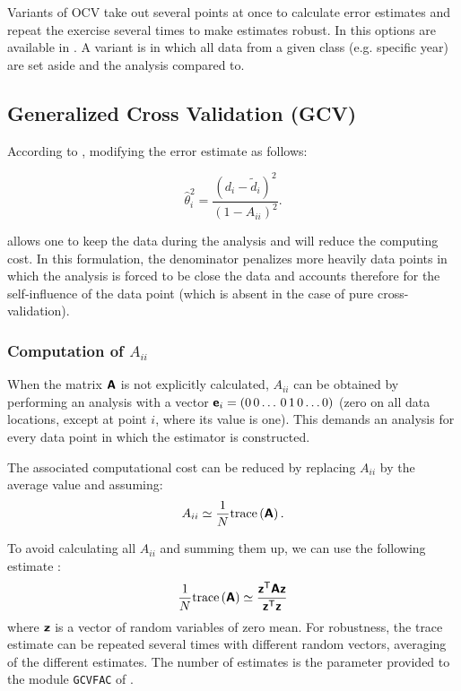 Variants of OCV take out several points at once to calculate error estimates and repeat the exercise several times to make estimates robust.  In \diva this options are available in . A variant is  in which all data from a given class (e.g. specific year) are set aside and the analysis compared to.


\subsection{Generalized Cross Validation (GCV)}

According to \citet{CRAVEN78}, modifying the error estimate as follows:

\begin{equation}
{\hat{\theta}_i^2} =  \frac{(d_i - \tilde{d}_i)^2}{(1 - A_{ii})^2}.
\label{eq:misfitestimate}
\end{equation}

allows one to keep the data during the analysis and will reduce the computing cost. In this formulation, the denominator penalizes more heavily data points in which the analysis is forced to be close the data and accounts therefore for the self-influence of the data point (which is absent in the case of pure cross-validation).

\subsubsection{Computation of $A_{ii}$}

When the matrix $\mbox{\boldmath $ \protect\mathsf{A} $}$ is not explicitly calculated, $A_{ii}$ can be obtained by performing an analysis with a vector $\mbox{\boldmath $ \protect\mathsf{e} $}_i=(0\,0\ldots\,0\,1\,0\ldots 0)$ (zero on all data locations, except at point $i$, where its value is one). This demands an analysis for every data point in which the estimator is constructed.  

The associated computational cost can be reduced by replacing $A_{ii}$ by the average value and assuming:
\begin{equation}
A_{ii} \simeq \frac{1}{N} \mathrm{trace}\left( \mbox{\boldmath $ \protect\mathsf{A} $} \right).
\label{eq:aiitrace}
\end{equation}

To avoid calculating all $A_{ii}$ and summing them up, we can use the following estimate \citep{GIRARD89}:
\begin{equation}
\frac{1}{N} \mathrm{trace}\left( \mbox{\boldmath $ \protect\mathsf{A} $} \right) \simeq  \frac{ {\mbox{\boldmath $ \protect\mathsf{z} $}}^\mathsf{T} \mbox{\boldmath $ \protect\mathsf{A} $} \mbox{\boldmath $ \protect\mathsf{z} $} }{{\mbox{\boldmath $ \protect\mathsf{z} $}}^\mathsf{T} \mbox{\boldmath $ \protect\mathsf{z} $} }
\label{eq:traceest}
\end{equation}
where $\mbox{\boldmath $ \protect\mathsf{z} $}$ is a vector of random variables of zero mean. For robustness, the trace estimate can be repeated several times with different random vectors, averaging of the different estimates. The number of estimates is the parameter provided to the module \texttt{GCVFAC} of \diva.


